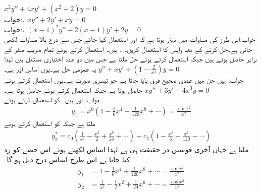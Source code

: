 \quad
$x^2y''+4xy'+(x^2+2)y=0$\\
جواب:، 
\quad
$xy''+2y'+xy=0$\\
جواب:، 
\quad 
$(x-1)^2y''-2(x-1)y'+2y=0$\\
جواب:اس طرز کی مساوات میں بہتر ہوتا ہے کہ  اور  استعمال کیا جائے جس سے درج بالا مساوات  لکھی جاتی ہے۔حل کرنے کے بعد واپس  کا استعمال کریں۔ 
،  ہیں۔ استعمال کرتے ہوئے تمام  ضریب  صفر کے برابر حاصل ہوتے ہیں جبکہ  استعمال کرتے ہوئے حل  ملتا ہے جس میں دو عدد اختیاری مستقل ہیں لہٰذا یہ عمومی حل ہے۔یوں اساس  اور  ہے۔
\quad
$y''+xy'+(1-\frac{2}{x^2})y=0$\\
جواب:  ہیں جن میں عددی صحیح فرق پایا جاتا ہے جو تیسری صورت ہے۔یوں  استعمال کرتے ہوئے    حاصل ہوتا ہے جبکہ  استعمال کرتے ہوئے  حاصل ہوتا ہے۔
\quad
$xy''+3y'+4x^3y=0$\\
جواب: اور  ہیں۔  کو استعمال کرتے ہوئے
\begin{align*}
y_1=x^{0}(1-\tfrac{1}{6}x^4+\tfrac{1}{120}x^8+\cdots)=\tfrac{\sin x^2}{x^2}
\end{align*}
ملتا ہے جبکہ  کو استعمال کرتے ہوئے
\begin{align*}
y^*_2=c_0(\frac{1}{x^2}-\frac{x^2}{2}+\frac{x^6}{24}+\cdots)+c_2(1-\frac{x^4}{6}+\frac{x^8}{120}-\cdots)
\end{align*}
ملتا ہے جہاں آخری قوسین در حقیقت  ہی ہے لہٰذا اساس لکھتے ہوئے اس حصے کو رد کیا جاتا ہے۔اس طرح اساس درج ذیل ہو گا۔
\begin{align*}
y_1&=1-\tfrac{1}{6}x^4+\tfrac{1}{120}x^8+\cdots=\tfrac{\sin x^2}{x^2}\\
y_2&=\frac{1}{x^2}-\tfrac{1}{2}x^2+\tfrac{1}{24}x^6+\cdots=\tfrac{\cos x^2}{x^2}
\end{align*}
